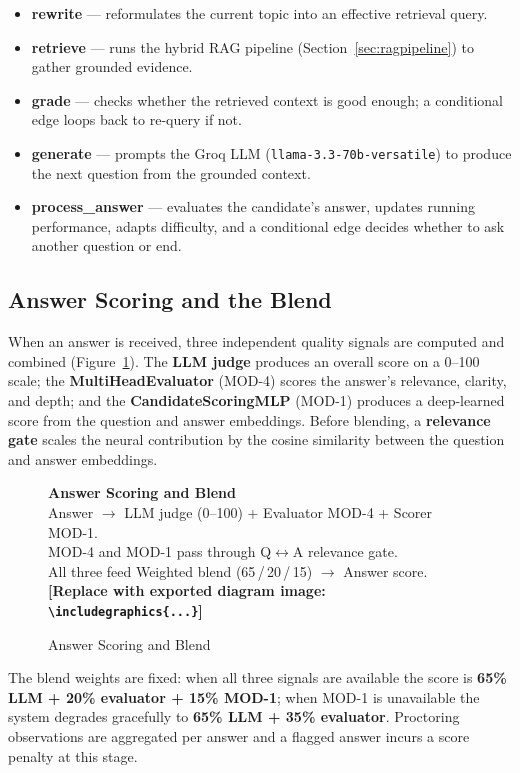 \documentclass[12pt,a4paper,oneside]{report}
\newcommand{\diagramplaceholder}[1]{%
  \begin{tcolorbox}[
    colback=gray!5, colframe=gray!50,
    boxrule=0.4pt, arc=2pt,
    left=10pt, right=10pt, top=8pt, bottom=8pt,
    fontupper=\small\itshape
  ]
  \centering #1\\[4pt]
  \textbf{[Replace with exported diagram image: \texttt{\textbackslash includegraphics\{...\}}]}
  \end{tcolorbox}%
}
\begin{document}
\begin{itemize}
  \item \textbf{rewrite} --- reformulates the current topic into an effective retrieval query.
  \item \textbf{retrieve} --- runs the hybrid RAG pipeline (Section~\ref{sec:ragpipeline}) to
    gather grounded evidence.
  \item \textbf{grade} --- checks whether the retrieved context is good enough; a conditional
    edge loops back to re-query if not.
  \item \textbf{generate} --- prompts the Groq LLM (\texttt{llama-3.3-70b-versatile}) to
    produce the next question from the grounded context.
  \item \textbf{process\_answer} --- evaluates the candidate's answer, updates running
    performance, adapts difficulty, and a conditional edge decides whether to ask another
    question or end.
\end{itemize}

\subsection{Answer Scoring and the Blend}

When an answer is received, three independent quality signals are computed and combined
(Figure~\ref{fig:blend}). The \textbf{LLM judge} produces an overall score on a 0--100 scale;
the \textbf{MultiHeadEvaluator} (MOD-4) scores the answer's relevance, clarity, and depth; and
the \textbf{CandidateScoringMLP} (MOD-1) produces a deep-learned score from the question and
answer embeddings. Before blending, a \textbf{relevance gate} scales the neural contribution
by the cosine similarity between the question and answer embeddings.

\begin{figure}[H]
\centering
\diagramplaceholder{%
  \textbf{Answer Scoring and Blend}\\
  Answer $\to$ LLM judge (0--100) + Evaluator MOD-4 + Scorer MOD-1.\\
  MOD-4 and MOD-1 pass through Q$\leftrightarrow$A relevance gate.\\
  All three feed Weighted blend (65\,/\,20\,/\,15) $\to$ Answer score.%
}
\caption{Answer Scoring and Blend}
\label{fig:blend}
\end{figure}

The blend weights are fixed: when all three signals are available the score is
\textbf{65\% LLM + 20\% evaluator + 15\% MOD-1}; when MOD-1 is unavailable the system
degrades gracefully to \textbf{65\% LLM + 35\% evaluator}. Proctoring observations are
aggregated per answer and a flagged answer incurs a score penalty at this stage.
\end{document}
